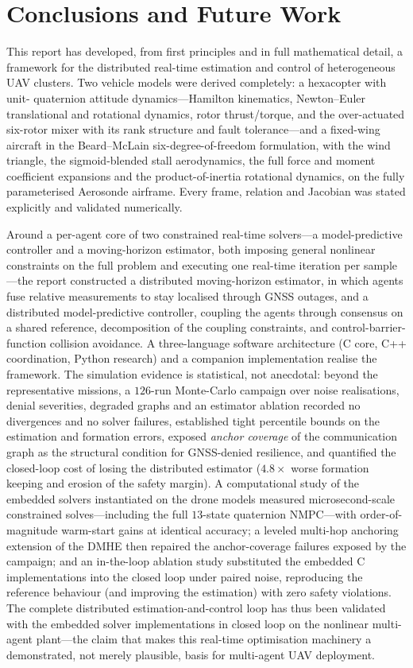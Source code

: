 \chapter{Conclusions and Future Work}
\label{ch:conclusion}

This report has developed, from first principles and in full mathematical detail,
a framework for the distributed real-time estimation and control of heterogeneous
UAV clusters. Two vehicle models were derived completely: a hexacopter with unit-%
quaternion attitude dynamics---Hamilton kinematics, Newton--Euler translational
and rotational dynamics, rotor thrust/torque, and the over-actuated six-rotor
mixer with its rank structure and fault tolerance---and a fixed-wing aircraft in
the Beard--McLain six-degree-of-freedom formulation, with the wind triangle, the
sigmoid-blended stall aerodynamics, the full force and moment coefficient
expansions and the product-of-inertia rotational dynamics, on the fully
parameterised Aerosonde airframe. Every frame, relation and Jacobian was stated
explicitly and validated numerically.

Around a per-agent core of two constrained real-time solvers---a model-predictive
controller and a moving-horizon estimator, both imposing general nonlinear
constraints on the full problem and executing one real-time iteration per
sample---the report constructed a distributed moving-horizon
estimator, in which agents fuse relative measurements to stay localised through
GNSS outages, and a distributed model-predictive controller, coupling the agents
through consensus on a shared reference, decomposition of the coupling
constraints, and control-barrier-function collision avoidance. A three-language
software architecture (C core, C++ coordination, Python research) and a companion
implementation realise the framework. The simulation evidence is statistical,
not anecdotal: beyond the representative missions, a $126$-run Monte-Carlo
campaign over noise realisations, denial severities, degraded graphs and an
estimator ablation recorded no divergences and no solver failures, established
tight percentile bounds on the estimation and formation errors, exposed
\emph{anchor coverage} of the communication graph as the structural condition
for GNSS-denied resilience, and quantified the closed-loop cost of losing the
distributed estimator ($4.8\times$ worse formation keeping and erosion of the
safety margin). A computational study of the embedded solvers instantiated on
the drone models measured microsecond-scale constrained solves---including the
full $13$-state quaternion NMPC---with order-of-magnitude warm-start gains at
identical accuracy; a leveled multi-hop anchoring extension of the DMHE then
repaired the anchor-coverage failures exposed by the campaign; and an
in-the-loop ablation study substituted the embedded C implementations into the
closed loop under paired noise, reproducing the reference behaviour (and
improving the estimation) with zero safety violations. The complete
distributed estimation-and-control loop has thus been validated with the
embedded solver implementations in closed loop on the nonlinear multi-agent
plant---the claim that makes this real-time optimisation machinery a
demonstrated, not merely plausible, basis for multi-agent UAV deployment.

